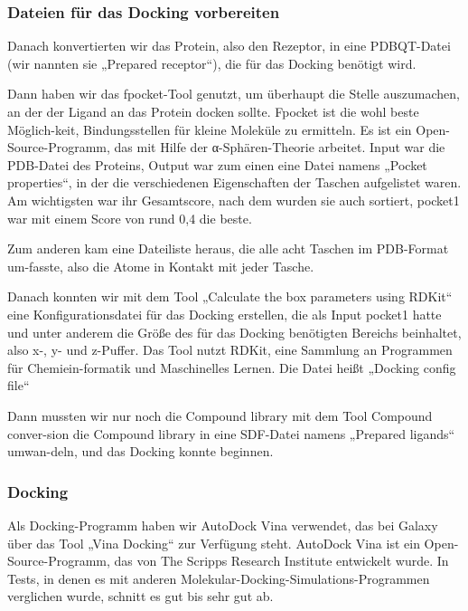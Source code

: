 \documentclass[11pt]{article}
\begin{document}
    \subsubsection{Dateien für das Docking vorbereiten}

    Danach konvertierten wir das Protein, also den Rezeptor, in eine PDBQT-Datei (wir nannten sie „Prepared receptor“), die für das Docking benötigt wird.

    Dann haben wir das fpocket-Tool genutzt, um überhaupt die Stelle auszumachen, an der der Ligand an das Protein docken sollte. Fpocket ist die wohl beste Möglich-keit, Bindungsstellen für kleine Moleküle zu ermitteln. Es ist ein Open-Source-Programm, das mit Hilfe der α-Sphären-Theorie arbeitet. Input war die PDB-Datei des Proteins, Output war zum einen eine Datei namens „Pocket properties“, in der die verschiedenen Eigenschaften der Taschen aufgelistet waren. Am wichtigsten war ihr Gesamtscore, nach dem wurden sie auch sortiert, pocket1 war mit einem Score von rund 0,4 die beste.


    Zum anderen kam eine Dateiliste heraus, die alle acht Taschen im PDB-Format um-fasste, also die Atome in Kontakt mit jeder Tasche.

    Danach konnten wir mit dem Tool „Calculate the box parameters using RDKit“ eine Konfigurationsdatei für das Docking erstellen, die als Input pocket1 hatte und unter anderem die Größe des für das Docking benötigten Bereichs beinhaltet, also x-, y- und z-Puffer. Das Tool nutzt RDKit, eine Sammlung an Programmen für Chemiein-formatik und Maschinelles Lernen. Die Datei heißt „Docking config file“

    Dann mussten wir nur noch die Compound library mit dem Tool Compound conver-sion die Compound library in eine SDF-Datei namens „Prepared ligands“ umwan-deln, und das Docking konnte beginnen.


    \subsubsection{Docking}

    Als Docking-Programm haben wir AutoDock Vina verwendet, das bei Galaxy über das Tool „Vina Docking“ zur Verfügung steht. AutoDock Vina ist ein Open-Source-Programm, das von The Scripps Research Institute entwickelt wurde. In Tests, in denen es mit anderen Molekular-Docking-Simulations-Programmen verglichen wurde, schnitt es gut bis sehr gut ab.
\end{document}
